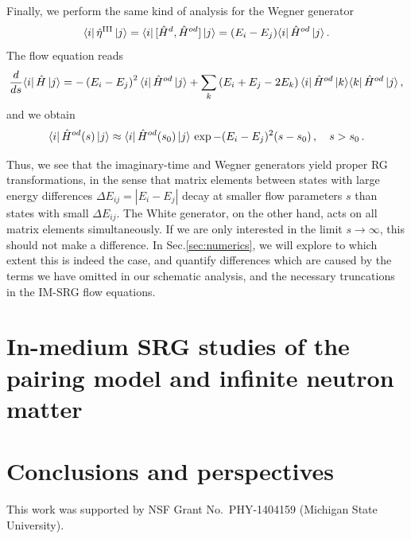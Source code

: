Finally, we perform the same kind of analysis for the Wegner generator
\begin{equation}
  \langle{i}|\,{\hat{\eta}^\text{III}}\,|{j}\rangle=\langle{i}|\,{[{\hat{H}^d},{\hat{H}^{od}}]}\,|{j}\rangle=(E_i-E_j)\langle{i}|\,{\hat{H}^{od}}\,|{j}\rangle\,.
\end{equation}
The flow equation reads
\begin{align}
  \totd{}{s}\matrixe{i}{\hat{H}}{j}
  =-\left(E_i-E_j\right)^2\matrixe{i}{\hat{H}^{od}}{j}
  +\sum_k\left(E_i+E_j-2E_k\right)\matrixe{i}{\hat{H}^{od}}{k}\matrixe{k}{\hat{H}^{od}}{j}\,,\label{eq:schema_wegner}
\end{align}
and we obtain
\begin{equation}
  \langle{i}|\,{\hat{H}^{od}(s)}\,|{j}\rangle \approx \langle{i}|\,{\hat{H}^{od}(s_0)}\,|{j}\rangle\,\exp{-(E_i-E_j)^2 (s-s_0)}\,, \quad s>s_0\,.
\end{equation}

Thus, we see that the imaginary-time and Wegner generators yield
proper RG transformations, in the sense that matrix elements between
states with large energy differences $\Delta E_{ij} = |E_i-E_j|$ decay
at smaller flow parameters $s$ than states with small $\Delta
E_{ij}$. The White generator, on the other hand, acts on all matrix
elements simultaneously. If we are only interested in the limit
$s\to\infty$, this should not make a difference. In
Sec.\ref{sec:numerics}, we will explore to which extent this is indeed
the case, and quantify differences which are caused by the terms we
have omitted in our schematic analysis, and the necessary truncations
in the IM-SRG flow equations.


\section{In-medium SRG studies of the pairing model and infinite neutron matter}

\section{Conclusions and perspectives}


\begin{acknowledgement}
This work was supported by NSF Grant No.~PHY-1404159 (Michigan State University).
\end{acknowledgement}

\begin{thebibliography}{99}


\end{thebibliography}

